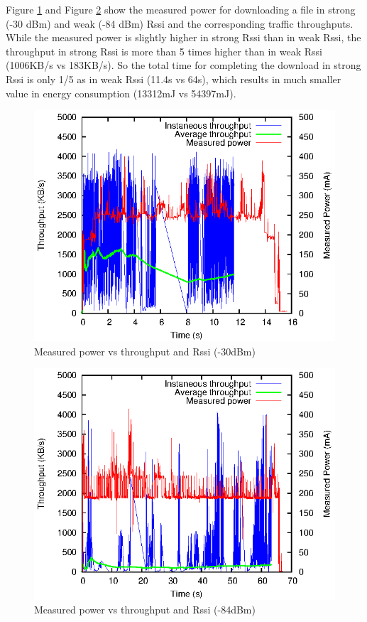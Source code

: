 \documentclass[journal]{IEEEtran}
\begin{document}
Figure \ref{energy_throughtput_30dbm} and Figure \ref{energy_throughtput_84dbm} show the measured power for downloading
a file in strong (-30 dBm) and weak (-84 dBm) Rssi and the corresponding traffic throughputs.
While the measured power is slightly higher in strong Rssi than in weak Rssi,
the throughput in strong Rssi is more than 5 times higher than in weak Rssi (1006KB/s vs 183KB/s).
So the total time for completing the download in strong 
Rssi is only 1/5 as in weak Rssi (11.4s vs 64s), which results 
in much smaller value in energy consumption (13312mJ vs 54397mJ).


\begin{figure}
\centering
\includegraphics[scale=0.95]{energy_throughtput_30dbm.eps}
\caption{Measured power vs throughput and Rssi (-30dBm)}
\label{energy_throughtput_30dbm}
\end{figure}

\begin{figure}
\centering
\includegraphics[scale=0.95]{energy_throughtput_84dbm.eps}
\caption{Measured power vs throughput and Rssi (-84dBm)}
\label{energy_throughtput_84dbm}
\end{figure}
\end{document}

